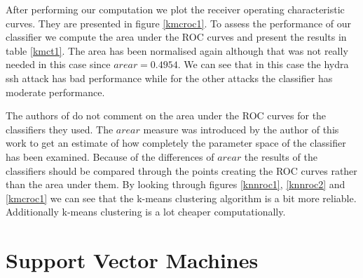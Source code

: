\documentclass[reqno,openany,12pt]{amsbook}
\begin{document}
%

After performing our computation we plot the receiver operating characteristic curves. They are presented in figure \ref{kmcroc1}. To assess the performance of our classifier we compute the area under the ROC curves and present the results in table \ref{kmct1}. The area has been normalised again although that was not really needed in this case since $arear = 0.4954$. We can see that in this case the hydra ssh attack has bad performance while for the other attacks the classifier has moderate performance.

The authors of \cite{adf1} do not comment on the area under the ROC curves for the classifiers they used.
The $arear$ measure was introduced by the author of this work to get an estimate of how completely the parameter space of the classifier has been examined. Because of the differences of $arear$ the results of the classifiers should be compared through the points creating the ROC curves rather than the area under them. By looking through figures \ref{knnroc1}, \ref{knnroc2} and \ref{kmcroc1} we can see that the k-means clustering algorithm is a bit more reliable.
Additionally k-means clustering is a lot cheaper computationally.



%

\section{Support Vector Machines}
\end{document}
